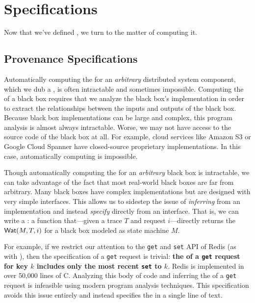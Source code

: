 \section{\WatProvenance{} Specifications}
Now that we've defined \watprovenance{}, we turn to the matter of computing it.

\subsection{Provenance Specifications}
Automatically computing the \watprovenance{} for an \emph{arbitrary}
distributed system component, which we dub a , is often
intractable and sometimes impossible. Computing the \watprovenance{} of a black
box requires that we analyze the black box's implementation in order to extract
the relationships between the inputs and outputs of the black box. Because
black box implementations can be large and complex, this program analysis is
almost always intractable. Worse, we may not have access to the source code of
the black box at all. For example, cloud services like Amazon S3 or Google
Cloud Spanner have closed-source proprietary implementations. In this case,
automatically computing \watprovenance{} is impossible.

\newcommand{\kvget}{\texttt{get}}
\newcommand{\kvset}{\texttt{set}}

Though automatically computing the \watprovenance{} for an \emph{arbitrary}
black box is intractable, we can take advantage of the fact that most
real-world black boxes are far from arbitrary. Many black boxes have complex
implementations but are designed with very simple interfaces.  This allows us
to sidestep the issue of \emph{inferring} \watprovenance{} from an
implementation and instead \emph{specify} \watprovenance{} directly from an
interface. That is, we can write a : a
function that---given a trace $T$ and request $i$---directly returns the
\watprovenance{} $\textsf{Wat}(M, T, i)$ for a black box modeled as state machine $M$.

For example, if we restrict our attention to the \kvget{} and \kvset{} API of
Redis (as with ), then the \watprovenance{}
specification of a \kvget{} request is trivial: \textbf{the \watprovenance{} of
a \kvget{} request for key $k$ includes only the most recent \kvset{} to
$k$}. Redis is implemented in over 50,000 lines of C. Analyzing this body of
code and inferring the \watprovenance{} of a \kvget{} request is infeasible
using modern program analysis techniques. This \watprovenance{} specification
avoids this issue entirely and instead specifies the \watprovenance{} in a
single line of text.

